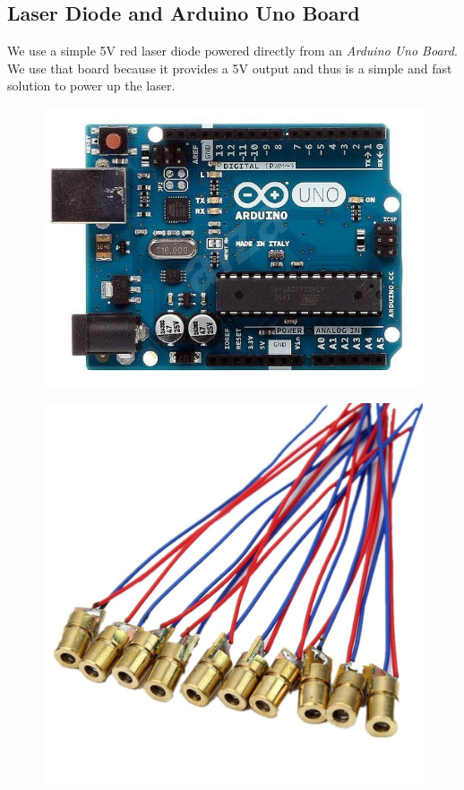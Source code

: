 \subsection{Laser Diode and Arduino Uno Board}
We use a simple 5V red laser diode powered directly from an \emph{Arduino Uno Board}. We use that board because it provides a 5V output and thus is a simple and fast solution to power up the laser.
\begin{figure}
\centering
\begin{minipage}{.5\textwidth}
  \centering
  \includegraphics[width=\linewidth]{img/arduino.jpg}
  \label{fig:arduino}
\end{minipage}%
\begin{minipage}{.5\textwidth}
  \centering
  \includegraphics[width=.75\linewidth]{img/diode.jpg}
  \label{fig:diode}
\end{minipage}
\end{figure}
\clearpage
